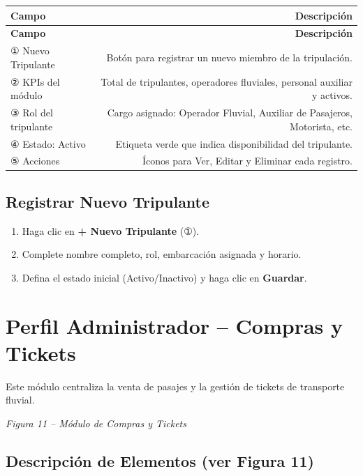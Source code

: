 \documentclass[12pt,a4paper]{article}
\begin{document}
\begin{longtable}{LR}
  \toprule
  \textbf{Campo} & \textbf{Descripción} \\
  \midrule
  \endfirsthead
  \toprule
  \textbf{Campo} & \textbf{Descripción} \\
  \midrule
  \endhead
  \bottomrule
  \endfoot
  ① Nuevo Tripulante   & Botón para registrar un nuevo miembro de la tripulación. \\[4pt]
  ② KPIs del módulo    & Total de tripulantes, operadores fluviales, personal auxiliar y activos. \\[4pt]
  ③ Rol del tripulante & Cargo asignado: Operador Fluvial, Auxiliar de Pasajeros, Motorista, etc. \\[4pt]
  ④ Estado: Activo     & Etiqueta verde que indica disponibilidad del tripulante. \\[4pt]
  ⑤ Acciones          & Íconos para Ver, Editar y Eliminar cada registro. \\
\end{longtable}

\subsection{Registrar Nuevo Tripulante}

\begin{enumerate}[leftmargin=1.5em]
  \item Haga clic en \textbf{+ Nuevo Tripulante} (①).
  \item Complete nombre completo, rol, embarcación asignada y horario.
  \item Defina el estado inicial (Activo/Inactivo) y haga clic en \textbf{Guardar}.
\end{enumerate}

\section{Perfil Administrador -- Compras y Tickets}

Este módulo centraliza la venta de pasajes y la gestión de tickets de transporte fluvial.

\textit{Figura 11 -- Módulo de Compras y Tickets}

\subsection{Descripción de Elementos (ver Figura 11)}
\end{document}

